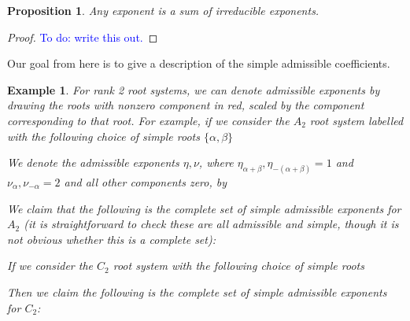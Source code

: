 \documentclass[12pt]{amsart}
\newcommand{\todo}[1]{\noindent  \textcolor{blue}{To do: #1}}
\theoremstyle{plain}
\newtheorem{proposition}[theorem]{Proposition}
\newtheorem{example}[theorem]{Example}
\begin{document}
\begin{proposition}
    Any exponent is a sum of irreducible exponents.
\end{proposition}
\begin{proof}
    \todo{write this out.}
\end{proof}

Our goal from here is to give a description of the simple admissible coefficients.

\begin{example}
For rank 2 root systems, we can denote admissible exponents by drawing the roots with nonzero component in red, scaled by the component corresponding to that root.
For example, if we consider the $A_2$ root system labelled with the following choice of simple roots $\{\alpha, \beta\}$


\noindent
We denote the admissible exponents $\eta, \nu$, where $\eta_{\alpha+\beta}, \eta_{-(\alpha+\beta)}=1$ and $\nu_{\alpha}, \nu_{-\alpha}=2$ and all other components zero, by


\noindent
We claim that the following is the complete set of simple admissible exponents for $A_2$ 
(it is straightforward to check these are all admissible and simple, though it is not obvious whether this is a complete set):


\noindent
If we consider the $C_2$ root system with the following choice of simple roots


\noindent
Then we claim the following is the complete set of simple admissible exponents for $C_2$:


\end{example}
\end{document}
